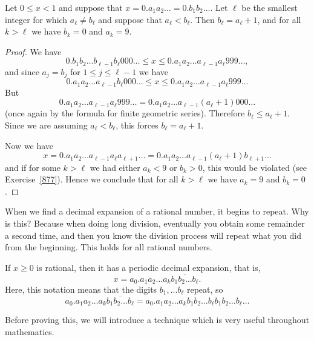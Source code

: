 \documentclass[11pt,dvipsnames]{book}
\numberwithin{equation}{section} %
\numberwithin{figure}{section} %
\numberwithin{table}{section} %
\begin{document}
\begin{theorem}\label{83}
Let $0 \leq x <1$ and suppose that $x=0.a_{1}a_2\ldots =0.b_{1}b_{2}\dots$. Let $\ell$ be the smallest integer for which $a_{\ell}\neq b_{\ell}$ and suppose that $a_{\ell}<b_{\ell}$. Then $b_{\ell}=a_{\ell}+1$, and for all $k> \ell$ we have $b_{k}=0$ and $a_{k}=9$.
\end{theorem}

\begin{proof}
We have 
\[ 0.b_{1}b_{2}\dots b_{\ell -1}b_{\ell}000 \ldots \leq x \leq 0.a_1 a_2 \dots a_{\ell - 1} a_{\ell} 999 \dots , \]
and since $a_j = b_j$ for $1 \leq j \leq \ell -1$ we have
\[0.a_1 a_2 \dots a_{\ell-1} b_{\ell}000\ldots \leq x \leq 0.a_1 a_2 \dots a_{\ell - 1} a_{\ell} 999 \dots \]
But 
\[0.a_1 a_2 \dots a_{\ell - 1} a_{\ell} 999 \ldots = 0.a_1 a_2 \dots a_{\ell - 1} (a_{\ell} +1)000 \dots\]
(once again by the formula for finite geometric series).
Therefore $ b_{\ell} \leq a_{\ell} +1$. Since we are assuming $a_{\ell} < b_{\ell}$, this forces $b_{\ell} = a_{\ell} +1$.

Now we have
\[ 
x = 0.a_1 a_2 \dots a_{\ell - 1} a_{\ell} a_{\ell + 1} \ldots = 0.a_1 a_2 \dots a_{\ell - 1} (a_{\ell} + 1) b_{\ell + 1} \ldots
\]
and if for some $k > \ell$ we had either $a_k < 9$ or $b_k > 0$, this would be violated (see Exercise~\ref{877}). Hence we conclude that for all $k > \ell$ we have $a_k = 9$ and $b_k = 0$.
\end{proof}

When we find a decimal expansion of a rational number, it begins to repeat. Why is this? Because when doing long division, eventually you obtain some remainder a second time, and then you know the division process will repeat what you did from the beginning. This holds for all rational numbers. 

\begin{lemma}
\label{l:rational->repeat}
If $x\geq 0$ is rational, then it has a periodic decimal expansion, that is, 
\[
x=a_0.a_{1}a_{2}\dots a_{k} \overline{b_{1}b_{2}\dots b_{\ell}}.\]
Here, this notation means that the digits $b_{1}, \dots b_{\ell}$ repeat, so 
\[
a_0.a_{1}a_{2}\ldots a_{k} \overline{b_{1}b_{2}\ldots b_{\ell}}
=a_0.a_{1}a_{2}\dots a_{k} {b_{1}b_{2}\dots b_{\ell}} {b_{1}b_{2}\dots b_{\ell}}\ldots
\]


\end{lemma}
\vspace{.5cm}
Before proving this, we will introduce a technique which is very useful throughout mathematics.
\vspace{.5cm}
\end{document}
